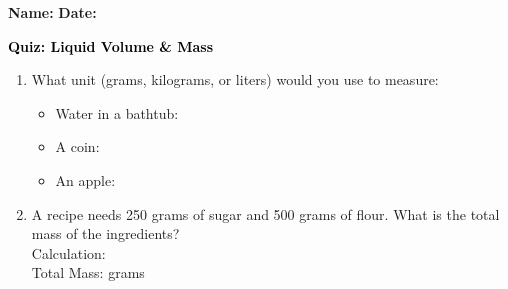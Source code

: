 \documentclass[12pt, letterpaper, fleqn]{article}
\newcommand{\blank}{\underline{\hspace{2.2cm}}}
\begin{document}
\textbf{Name:} \underline{\hspace{5cm}}
\hfill
\textbf{Date:} \underline{\hspace{3cm}}\\

\begin{tcolorbox}[colback=customteal!20]
    \large\textcolor{black}{\textbf{Quiz: Liquid Volume & Mass}}
\end{tcolorbox}

\vspace{5mm}
\begin{enumerate}[itemsep=2.5cm, leftmargin=0.6cm]
\item What unit (grams, kilograms, or liters) would you use to measure:
  \begin{itemize}[itemsep=0.8cm]
    \item Water in a bathtub: \blank
    \item A coin: \blank
    \item An apple: \blank
  \end{itemize}

\item A recipe needs 250 grams of sugar and 500 grams of flour. What is the total mass of the ingredients?
\\
Calculation: \vspace{2cm}
\\
Total Mass: \blank grams
\end{enumerate}
\end{document}
